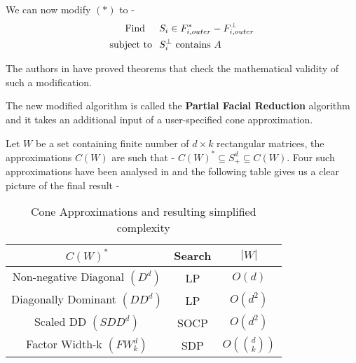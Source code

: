 \documentclass[twoside]{article}
\begin{document}
\begin{multicols}{2}
We can now modify $(*)$ to - 
	\begin{align*}
			\mbox{Find} \hspace{0.2in} & S_i \in F_{i,outer}^*-F_{i,outer}^{\perp} \\
			\mbox{subject to} \hspace{0.1in} & S_i^{\perp} \mbox{ contains } A
    \end{align*}
    
The authors in \cite{permenter2014partial} have proved theorems that check the mathematical validity of such a modification. 

The new modified algorithm is called the \textbf{Partial Facial Reduction} algorithm and it takes an additional input of a user-specified cone approximation. 

Let $W$ be a set containing finite number of $d \times k$ rectangular matrices, the approximations $C(W)$ are such that - $C(W)^* \subseteq S_+^d \subseteq C(W)$. Four such approximations have been analysed in \cite{permenter2014partial} and the following table gives us a clear picture of the final result -

\begin{table}[H]
	\caption{Cone Approximations and resulting simplified complexity}
	\centering
	\begin{tabular}{|c|c|c|}
		\hline
		$C(W)^*$ & Search & $|W|$ \\
		\midrule
		Non-negative Diagonal $(D^d)$ & LP & $O(d)$\\
		Diagonally Dominant $(DD^d)$ & LP & $O(d^2)$\\
		Scaled DD $(SDD^d)$ & SOCP & $O(d^2)$\\
		Factor Width-k $(FW^d_k)$ & SDP & $O\left(\binom{d}{k}\right)$\\
		\bottomrule
	\end{tabular}
\end{table}


\end{multicols}
\end{document}
